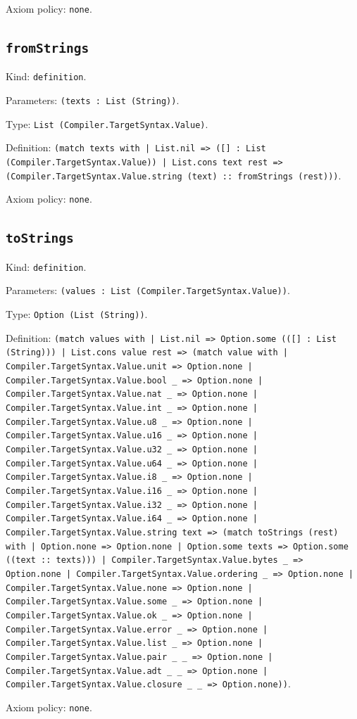 \documentclass[11pt]{article}
\begin{document}
\noindent Axiom policy: \texttt{none}.\par
\subsection*{\texttt{fromStrings}}
\noindent Kind: \texttt{definition}.\par
\noindent Parameters: \texttt{(texts : List (String))}.\par
\noindent Type: \texttt{List (Compiler.TargetSyntax.Value)}.\par
\noindent Definition: \texttt{(match texts with | List.nil => ([] : List (Compiler.TargetSyntax.Value)) | List.cons text rest => (Compiler.TargetSyntax.Value.string (text) :: fromStrings (rest)))}.\par
\noindent Axiom policy: \texttt{none}.\par
\subsection*{\texttt{toStrings}}
\noindent Kind: \texttt{definition}.\par
\noindent Parameters: \texttt{(values : List (Compiler.TargetSyntax.Value))}.\par
\noindent Type: \texttt{Option (List (String))}.\par
\noindent Definition: \texttt{(match values with | List.nil => Option.some (([] : List (String))) | List.cons value rest => (match value with | Compiler.TargetSyntax.Value.unit => Option.none | Compiler.TargetSyntax.Value.bool \_ => Option.none | Compiler.TargetSyntax.Value.nat \_ => Option.none | Compiler.TargetSyntax.Value.int \_ => Option.none | Compiler.TargetSyntax.Value.u8 \_ => Option.none | Compiler.TargetSyntax.Value.u16 \_ => Option.none | Compiler.TargetSyntax.Value.u32 \_ => Option.none | Compiler.TargetSyntax.Value.u64 \_ => Option.none | Compiler.TargetSyntax.Value.i8 \_ => Option.none | Compiler.TargetSyntax.Value.i16 \_ => Option.none | Compiler.TargetSyntax.Value.i32 \_ => Option.none | Compiler.TargetSyntax.Value.i64 \_ => Option.none | Compiler.TargetSyntax.Value.string text => (match toStrings (rest) with | Option.none => Option.none | Option.some texts => Option.some ((text :: texts))) | Compiler.TargetSyntax.Value.bytes \_ => Option.none | Compiler.TargetSyntax.Value.ordering \_ => Option.none | Compiler.TargetSyntax.Value.none => Option.none | Compiler.TargetSyntax.Value.some \_ => Option.none | Compiler.TargetSyntax.Value.ok \_ => Option.none | Compiler.TargetSyntax.Value.error \_ => Option.none | Compiler.TargetSyntax.Value.list \_ => Option.none | Compiler.TargetSyntax.Value.pair \_ \_ => Option.none | Compiler.TargetSyntax.Value.adt \_ \_ => Option.none | Compiler.TargetSyntax.Value.closure \_ \_ => Option.none))}.\par
\noindent Axiom policy: \texttt{none}.\par
\end{document}
